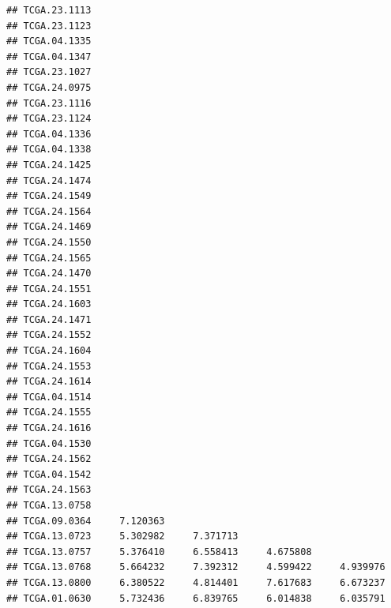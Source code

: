 \documentclass[UTF8]{beamer}\usepackage[]{graphicx}\usepackage[]{color}
\makeatletter
\newenvironment{kframe}{%
 \def\at@end@of@kframe{}%
 \ifinner\ifhmode%
  \def\at@end@of@kframe{\end{minipage}}%
  \begin{minipage}{\columnwidth}%
 \fi\fi%
 \def\FrameCommand##1{\hskip\@totalleftmargin \hskip-\fboxsep
 \colorbox{shadecolor}{##1}\hskip-\fboxsep
     \hskip-\linewidth \hskip-\@totalleftmargin \hskip\columnwidth}%
 \MakeFramed {\advance\hsize-\width
   \@totalleftmargin\z@ \linewidth\hsize
   \@setminipage}}%
 {\par\unskip\endMakeFramed%
 \at@end@of@kframe}
\newenvironment{knitrout}{}{} %
\makeatother
\begin{document}
\begin{frame}[fragile]
\begin{knitrout}
\begin{kframe}
\begin{verbatim}
## TCGA.23.1113                                                    
## TCGA.23.1123                                                    
## TCGA.04.1335                                                    
## TCGA.04.1347                                                    
## TCGA.23.1027                                                    
## TCGA.24.0975                                                    
## TCGA.23.1116                                                    
## TCGA.23.1124                                                    
## TCGA.04.1336                                                    
## TCGA.04.1338                                                    
## TCGA.24.1425                                                    
## TCGA.24.1474                                                    
## TCGA.24.1549                                                    
## TCGA.24.1564                                                    
## TCGA.24.1469                                                    
## TCGA.24.1550                                                    
## TCGA.24.1565                                                    
## TCGA.24.1470                                                    
## TCGA.24.1551                                                    
## TCGA.24.1603                                                    
## TCGA.24.1471                                                    
## TCGA.24.1552                                                    
## TCGA.24.1604                                                    
## TCGA.24.1553                                                    
## TCGA.24.1614                                                    
## TCGA.04.1514                                                    
## TCGA.24.1555                                                    
## TCGA.24.1616                                                    
## TCGA.04.1530                                                    
## TCGA.24.1562                                                    
## TCGA.04.1542                                                    
## TCGA.24.1563                                                    
## TCGA.13.0758                                                    
## TCGA.09.0364     7.120363                                       
## TCGA.13.0723     5.302982     7.371713                          
## TCGA.13.0757     5.376410     6.558413     4.675808             
## TCGA.13.0768     5.664232     7.392312     4.599422     4.939976
## TCGA.13.0800     6.380522     4.814401     7.617683     6.673237
## TCGA.01.0630     5.732436     6.839765     6.014838     6.035791

\end{verbatim}
\end{kframe}
\end{knitrout}
\end{frame}
\end{document}

